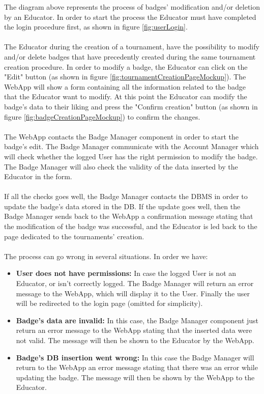 \documentclass{article}
\begin{document}
{        The diagram above represents the process of badges' modification and/or deletion by an 
        Educator. In order to start the process the Educator must have completed the login 
        procedure first, as shown in figure \ref{fig:userLogin}.
        \\ \\
        The Educator during the creation of a tournament, have the possibility to modify and/or
        delete badges that have precedently created during the same tournament creation procedure.
        In order to modify a badge, the Educator can click on the "Edit" button 
        (as shown in figure \ref{fig:tournamentCreationPageMockup}). The WebApp will show a form 
        containing all the information related to the badge that the Educator want to modify.
        At this point the Educator can modify the badge's data to their liking and press the
        "Confirm creation" button (as shown in figure \ref{fig:badgeCreationPageMockup}) to confirm the changes.
        \\ \\
        The WebApp contacts the Badge Manager component in order to start the badge's edit.
        The Badge Manager communicate with the Account Manager which will check whether the 
        logged User has the right permission to modify the badge. The Badge Manager will also
        check the validity of the data inserted by the Educator in the form.
        \\ \\
        If all the checks goes well, the Badge Manager contacts the DBMS in order to update the
        badge's data stored in the DB.
        If the update goes well, then the Badge Manager sends back to the WebApp a confirmation
        message stating that the modification of the badge was successful, and the Educator 
        is led back to the page dedicated to the tournaments' creation.
        \\ \\
        The process can go wrong in several situations. In order we have:
        \begin{itemize}
            \item \textbf{User does not have permissions:} In case the logged User is not an
            Educator, or isn't correctly logged. The Badge Manager will return an
            error message to the WebApp, which will display it to the User.
            Finally the user will be redirected to the login page (omitted for simplicity).
            \item \textbf{Badge's data are invalid:} In this case, the Badge Manager component 
            just return an error message to the WebApp stating that the inserted data were not 
            valid. The message will then be shown to the Educator by the WebApp.
            \item \textbf{Badge's DB insertion went wrong:} In this case the Badge Manager will 
            return to the WebApp an error message stating that there was an error while updating 
            the badge. The message will then be shown by the WebApp to the Educator.
        \end{itemize}


}
\end{document}
